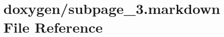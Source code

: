 \hypertarget{subpage__3_8markdown}{}\section{doxygen/subpage\+\_\+3.markdown File Reference}
\label{subpage__3_8markdown}

